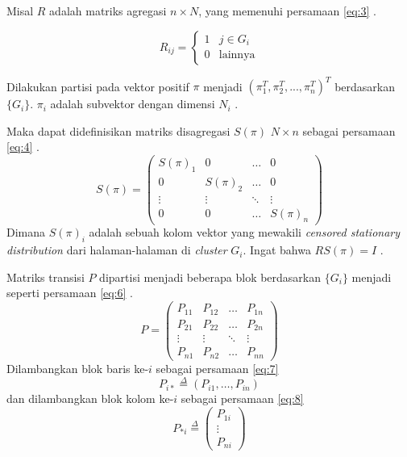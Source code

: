 \documentclass[
	a4paper, %
	12pt, %
	unnumberedsections, %
	twoside, %
]{LTJournalArticle}
\begin{document}
Misal $R$ adalah matriks agregasi $n \times N$, yang memenuhi persamaan \ref{eq:3} \citep{zhuetal2005distributedPagerank}.

\begin{equation}
	\label{eq:3}
	R_{ij}= 
	\begin{cases}
			1 & j \in G_i\\
			0 & \text{lainnya}
	\end{cases}
\end{equation}

Dilakukan partisi pada vektor positif $\pi$ menjadi $(\pi^T_1,\pi^T_2,...,\pi^T_n)^T$ berdasarkan $\{G_i\}$. $\pi_i$ adalah subvektor dengan dimensi $N_i$ \citep{zhuetal2005distributedPagerank}.

Maka dapat didefinisikan matriks disagregasi $S(\pi)$ $N \times n$ sebagai persamaan \ref{eq:4} \citep{zhuetal2005distributedPagerank}.
\begin{equation}
	\label{eq:4}
	S(\pi) = 
	\begin{pmatrix}
		S(\pi)_1 & 0 & \ldots & 0 \\
		0 & S(\pi)_2 & \ldots & 0 \\
		\vdots & \vdots & \ddots & \vdots \\
		0 & 0 & \ldots & S(\pi)_n
	\end{pmatrix}
\end{equation}
Dimana $S(\pi)_i$ adalah sebuah kolom vektor yang mewakili \textit{censored stationary distribution} dari halaman-halaman di \textit{cluster} $G_i$. Ingat bahwa $RS(\pi) = I$ \citep{zhuetal2005distributedPagerank}.

Matriks transisi $P$ dipartisi menjadi beberapa blok berdasarkan $\{G_i\}$ menjadi seperti persamaan \ref{eq:6} \citep{zhuetal2005distributedPagerank}.
\begin{equation}
\label{eq:6}
	P =
	\begin{pmatrix}
		P_{11} & P_{12} & \ldots & P_{1n} \\
		P_{21} & P_{22} & \ldots & P_{2n} \\
		\vdots & \vdots & \ddots & \vdots \\
		P_{n1} & P_{n2} & \ldots & P_{nn}
	\end{pmatrix}
\end{equation}
Dilambangkan blok baris ke-$i$ sebagai persamaan \ref{eq:7}
\begin{equation}
\label{eq:7}
	P_{i*} \overset{\Delta}{=} (P_{i1},\ldots,P_{in})
\end{equation}
dan dilambangkan blok kolom ke-$i$ sebagai persamaan \ref{eq:8}
\begin{equation}
\label{eq:8}
	P_{*i} \overset{\Delta}{=}
	\begin{pmatrix}
		P_{1i} \\
		\vdots \\
		P_{ni} 
	\end{pmatrix}
\end{equation} 
\end{document}
